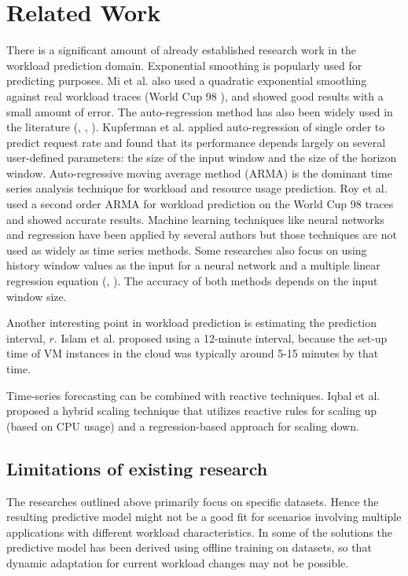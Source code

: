 \section{Related Work}

There is a significant amount of already established research work in the workload prediction domain. Exponential smoothing is popularly used for predicting purposes. Mi et al. \cite{Mi_2010} also used a quadratic exponential smoothing against real workload traces (World Cup 98 \cite{worldcup}), and showed good results with a small amount of error. The auto-regression method has also been widely used in the literature (\cite{key}, \cite{Khatua_2010}, \cite{Zhenhuan_Gong_2010}). Kupferman et al. \cite{key} applied auto-regression of single order to predict request rate and found that its performance depends largely on several user-defined parameters: the size of the input window and the size of the horizon window. Auto-regressive moving average method (ARMA) is the dominant time series analysis technique for workload and resource usage prediction. Roy et al. \cite{Roy_2011} used a second order ARMA for workload prediction on the World Cup 98 traces and showed accurate results. Machine learning techniques like neural networks and regression have been applied by several authors but those techniques are not used as widely as time series methods. Some researches also focus on using history window values as the input for a neural network \cite{Islam_2012} and a multiple linear regression equation (\cite{key}, \cite{Islam_2012}). The accuracy of both methods depends on the input window size.

Another interesting point in workload prediction is estimating the prediction interval, $r$. Islam et al. \cite{Islam_2012} proposed using a 12-minute interval, because the set-up time of VM instances in the cloud was typically around 5-15 minutes by that time.

Time-series forecasting can be combined with reactive techniques. Iqbal et al. \cite{Iqbal_2011} proposed a hybrid scaling technique that utilizes reactive rules for scaling up (based on CPU usage) and a regression-based approach for scaling down.

\subsection{Limitations of existing research}

The researches outlined above primarily focus on specific datasets. Hence the resulting predictive model might not be a good fit for scenarios involving multiple applications with different workload characteristics. In some of the solutions the predictive model has been derived using offline training on datasets, so that dynamic adaptation for current workload changes may not be possible.

